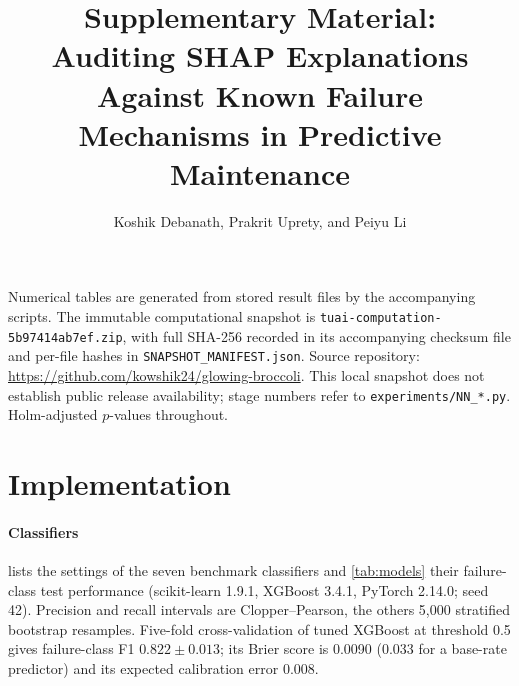 \documentclass[10pt]{article}
\title{Supplementary Material:\\Auditing SHAP Explanations Against Known Failure Mechanisms in Predictive Maintenance}
\author{Koshik Debanath, Prakrit Uprety, and Peiyu Li}
\date{}
\begin{document}
\maketitle

Numerical tables are generated from stored result files by the accompanying scripts. The immutable computational snapshot is \texttt{tuai-computation-5b97414ab7ef.zip}, with full SHA-256 recorded in its accompanying checksum file and per-file hashes in \texttt{SNAPSHOT\_MANIFEST.json}. Source repository: \url{https://github.com/kowshik24/glowing-broccoli}. This local snapshot does not establish public release availability; stage numbers refer to \texttt{experiments/NN\_*.py}. Holm-adjusted $p$-values throughout.

\section{Implementation}

\paragraph{Classifiers}  lists the settings of the seven benchmark classifiers and \cref{tab:models} their failure-class test performance (scikit-learn 1.9.1, XGBoost 3.4.1, PyTorch 2.14.0; seed 42). Precision and recall intervals are Clopper--Pearson, the others 5{,}000 stratified bootstrap resamples. Five-fold cross-validation of tuned XGBoost at threshold 0.5 gives failure-class F1 $0.822\pm0.013$; its Brier score is 0.0090 (0.033 for a base-rate predictor) and its expected calibration error 0.008.

\begin{table}[htbp]
\centering
\caption{Classifier settings.}
\label{tab:config}
\small

\end{table}

\begin{table}[htbp]
\centering
\caption{Failure-class test performance, sorted by F1; parentheses: 95\% bootstrap interval for F1.}
\label{tab:models}
\small

\end{table}
\end{document}
